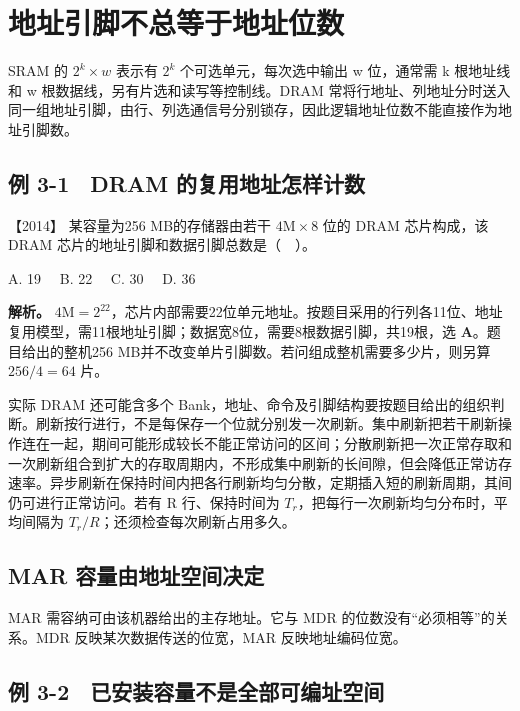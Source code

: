 \section{地址引脚不总等于地址位数}\label{co-03-03}

SRAM 的 \(2^k\times w\) 表示有 \(2^k\) 个可选单元，每次选中输出 w 位，通常需 k 根地址线和 w 根数据线，另有片选和读写等控制线。DRAM 常将行地址、列地址分时送入同一组地址引脚，由行、列选通信号分别锁存，因此逻辑地址位数不能直接作为地址引脚数。

\subsection{例 3-1　DRAM 的复用地址怎样计数}\label{co-ex3-1}

\noindent{}【2014】 某容量为256 MB的存储器由若干 \(4\mathrm M\times8\) 位的 DRAM 芯片构成，该 DRAM 芯片的地址引脚和数据引脚总数是（　）。

A. 19　 B. 22　 C. 30　 D. 36


\textbf{解析。} \(4\mathrm M=2^{22}\)，芯片内部需要22位单元地址。按题目采用的行列各11位、地址复用模型，需11根地址引脚；数据宽8位，需要8根数据引脚，共19根，选 \textbf{A}。题目给出的整机256 MB并不改变单片引脚数。若问组成整机需要多少片，则另算 \(256/4=64\) 片。

实际 DRAM 还可能含多个 Bank，地址、命令及引脚结构要按题目给出的组织判断。刷新按行进行，不是每保存一个位就分别发一次刷新。集中刷新把若干刷新操作连在一起，期间可能形成较长不能正常访问的区间；分散刷新把一次正常存取和一次刷新组合到扩大的存取周期内，不形成集中刷新的长间隙，但会降低正常访存速率。异步刷新在保持时间内把各行刷新均匀分散，定期插入短的刷新周期，其间仍可进行正常访问。若有 R 行、保持时间为 \(T_r\)，把每行一次刷新均匀分布时，平均间隔为 \(T_r/R\)；还须检查每次刷新占用多久。

\subsection{MAR 容量由地址空间决定}\label{co-c03-h37}

MAR 需容纳可由该机器给出的主存地址。它与 MDR 的位数没有``必须相等''的关系。MDR 反映某次数据传送的位宽，MAR 反映地址编码位宽。

\subsection{例 3-2　已安装容量不是全部可编址空间}\label{co-ex3-2}

